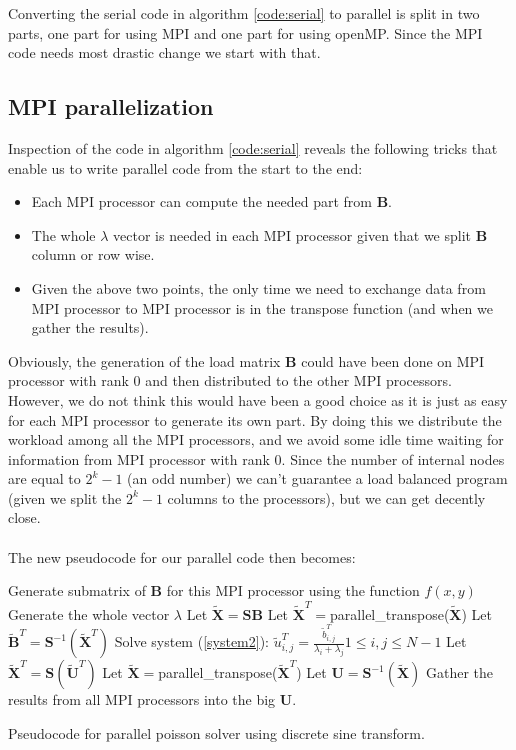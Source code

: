 Converting the serial code in algorithm \ref{code:serial} to parallel is split in two parts, one part for using MPI and one part for using openMP. Since the MPI code needs most drastic change we start with that.

\subsection*{MPI parallelization}
Inspection of the code in algorithm \ref{code:serial} reveals the following tricks that enable us to write parallel code from the start to the end:
\begin{itemize}
\item Each MPI processor can compute the needed part from $\textbf{B}$.
\item The whole $\lambda$ vector is needed in each MPI processor given that we split $\textbf{B}$ column or row wise.
\item Given the above two points, the only time we need to exchange data from MPI processor to MPI processor is in the transpose function (and when we gather the results).
\end{itemize}
Obviously, the generation of the load matrix $\mathbf{B}$ could have been done on MPI processor with rank $0$ and then distributed to the other MPI processors. However, we do not think this would have been a good choice as it is just as easy for each MPI processor to generate its own part. By doing this we distribute the workload among all the MPI processors, and we avoid some idle time waiting for information from MPI processor with rank $0$. Since the number of internal nodes are equal to $2^k-1$ (an odd number) we can't guarantee a load balanced program (given we split the $2^k-1$ columns to the processors), but we can get decently close.\\
\\
The new pseudocode for our parallel code then becomes:\\
\begin{algorithm}[H]
 Generate submatrix of $\textbf{B}$ for this MPI processor using the function $f(x,y)$\;
 Generate the whole vector $\lambda$ \;
 Let $\mathbf{\widetilde{X}} = \mathbf{SB}$  \;
 Let $\mathbf{\widetilde{X}}^T = $parallel\_transpose($\mathbf{\widetilde{X}}$)   \;
 Let $\mathbf{\widetilde{B}}^T = \mathbf{S}^{-1}(\mathbf{\widetilde{X}}^T)$ \;
 Solve system (\ref{system2}): $\tilde{u}^T_{i,j} = \frac{\tilde{b}^T_{i,j}}{\lambda_i + \lambda_j} 1 \leq i, j \leq N-1$\;
 Let $\mathbf{\widetilde{X}}^T = \mathbf{S}(\mathbf{\tilde{U}}^T)$  \;
 Let $\mathbf{\widetilde{X}} = $parallel\_transpose($\mathbf{\widetilde{X}}^T$)   \;
 Let $\mathbf{U} = \mathbf{S}^{-1}(\mathbf{\widetilde{X}}) $ \;
 Gather the results from all MPI processors into the big $\mathbf{U}$.
 \caption{Pseudocode for parallel poisson solver using discrete sine transform.}
 \label{code:parallel}
\end{algorithm}
